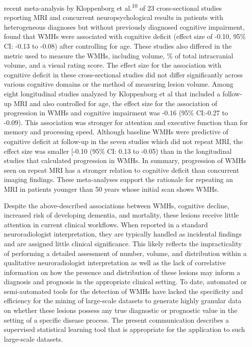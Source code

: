 \documentclass[11pt,]{article}
\begin{document}
 recent meta-analysis by Kloppenborg et
al.\textsuperscript{10} of 23 cross-sectional studies reporting MRI and
concurrent neuropsychological results in patients with heterogeneous
diagnoses but without previously diagnosed cognitive impairment, found
that WMHs were associated with cognitive deficit (effect size of -0.10,
95\% CI: -0.13 to -0.08) after controlling for age. These studies also
differed in the metric used to measure the WMHs, including volume, \% of
total intracranial volume, and a visual rating score. The effect size
for the association with cognitive deficit in these cross-sectional
studies did not differ significantly across various cognitive domains or
the method of measuring lesion volume. Among eight longitudinal studies
analyzed by Kloppenborg et al that included a follow-up MRI and also
controlled for age, the effect size for the association of progression
in WMHs and cognitive impairment was -0.16 (95\% CI:-0.27 to -0.09).
This association was stronger for attention and executive function than
for memory and processing speed. Although baseline WMHs were predictive
of cognitive deficit at follow-up in the seven studies which did not
repeat MRI, the effect size was smaller {[}-0.10 (95\% CI: 0.13 to
-0.05) than in the longitudinal studies that calculated progression in
WMHs. In summary, progression of WMHs seen on repeat MRI has a stronger
relation to cognitive deficit than concurrent imaging findings. These
meta-analyses support the rationale for repeating an MRI in patients
younger than 50 years whose initial scan shows WMHs.

Despite the above-described associations between WMHs, cognitive
decline, increased risk of developing dementia, and mortality, these
lesions receive little attention in current clinical workflows. When
reported in a standard neuroradiologist interpretation, they are
typically handled as incidental findings and are assigned little
clinical significance. This likely reflects the impracticality of
performing a detailed assessment of number, volume, and distribution
within a qualitative neuroradiologist interpretation as well as the lack
of correlative information on how the presence and distribution of these
lesions may inform a diagnosis and prognosis in the appropriate clinical
setting. To date, automated or semi-automated tools for the detection of
WMHs have lacked the specificity and efficiency for the mining of
large-scale datasets to generate highly granular data on whether these
lesions possess any true diagnostic or prognostic value in the setting
of a specific disease process. The present communication describes a
supervised statistical learning tool that is appropriate for the
application to such large-scale datasets.
\end{document}
